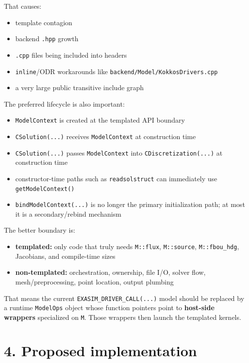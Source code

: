 \documentclass[11pt]{article}
\begin{document}
That causes:

\begin{itemize}[leftmargin=*]
\item template contagion
\item backend \texttt{.hpp} growth
\item \texttt{.cpp} files being included into headers
\item \texttt{inline}/ODR workarounds like \texttt{backend/Model/KokkosDrivers.cpp}
\item a very large public transitive include graph
\end{itemize}

The preferred lifecycle is also important:

\begin{itemize}[leftmargin=*]
\item \texttt{ModelContext} is created at the templated API boundary
\item \texttt{CSolution(...)} receives \texttt{ModelContext} at construction time
\item \texttt{CSolution(...)} passes \texttt{ModelContext} into \texttt{CDiscretization(...)} at construction time
\item constructor-time paths such as \texttt{readsolstruct} can immediately use \texttt{getModelContext()}
\item \texttt{bindModelContext(...)} is no longer the primary initialization path; at most it is a secondary/rebind mechanism
\end{itemize}

The better boundary is:

\begin{itemize}[leftmargin=*]
\item \textbf{templated:} only code that truly needs \texttt{M::flux}, \texttt{M::source}, \texttt{M::fbou\_hdg}, Jacobians, and compile-time sizes
\item \textbf{non-templated:} orchestration, ownership, file I/O, solver flow, mesh/preprocessing, point location, output plumbing
\end{itemize}

That means the current \texttt{EXASIM\_DRIVER\_CALL(...)} model should be replaced by a runtime \texttt{ModelOps} object whose function pointers point to \textbf{host-side wrappers} specialized on \texttt{M}. Those wrappers then launch the templated kernels.

\section*{4. Proposed implementation}
\end{document}
